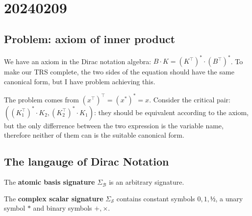 \chapter{20240209}

\newcommand*{\unit}{\texttt{unit}}
\newcommand*{\utt}{\texttt{tt}}
\newcommand*{\fst}{\texttt{fst}}
\newcommand*{\snd}{\texttt{snd}}
\newcommand*{\reduce}{\ \triangleright\ }
\newcommand*{\reducefrom}{\ \triangleleft\ }

\newcommand*{\zeroK}[1]{\mathbf{0}_{\mathcal{K}(#1)}}
\newcommand*{\zeroB}[1]{\mathbf{0}_{\mathcal{B}(#1)}}
\newcommand*{\zeroO}[1]{\mathbf{0}_{\mathcal{O}(#1)}}


\section{Problem: axiom of inner product}
We have an axiom in the Dirac notation algebra: $B \cdot K = (K^\top)^* \cdot (B^\top)^*$. To make our TRS complete, the two sides of the equation should have the same canonical form, but I have problem achieving this.

The problem comes from $(x^\top)^\top = (x^*)^* = x$. Consider the critical pair: $((K_1^\top)^* \cdot K_2, (K_2^\top)^* \cdot K_1)$: they should be equivalent according to the axiom, but the only differrence between the two expression is the variable name, therefore neither of them can is the suitable canonical form.



\section{The langauge of Dirac Notation}

\begin{definition} 
  The \textbf{atomic basis signature} $\Sigma_\mathcal{B}$ is an arbitrary signature.
\end{definition}

\begin{definition} 
  The \textbf{complex scalar signature} $\Sigma_\mathcal{S}$ contains constant symbols $0, 1, \text{½}$, a unary symbol $*$ and binary symbols $+, \times$.
\end{definition}

